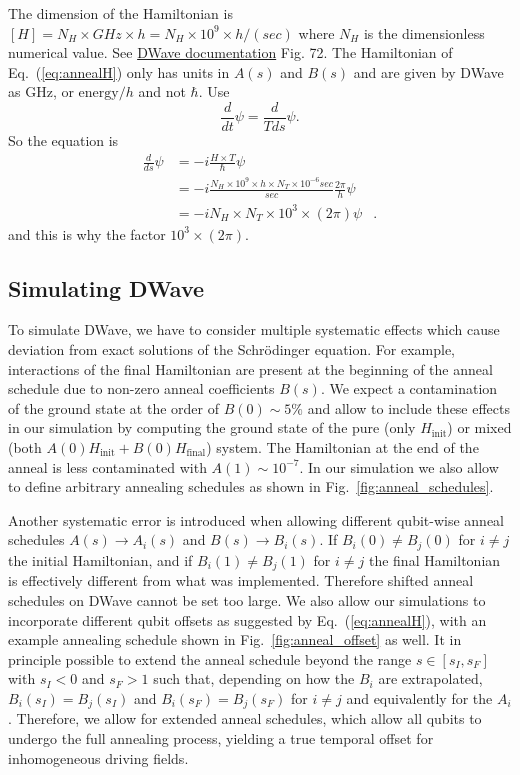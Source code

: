 \documentclass[]{article}
\begin{document}
The dimension of the Hamiltonian is $[H]=N_H \times GHz \times h =N_H \times 10^9  \times h/( sec)$ where $N_H$ is the dimensionless numerical value. See 
\href{https://docs.dwavesys.com/docs/latest/c_qpu_0.html#quantum-annealing-with-ising-spins-in-a-transverse-field}{DWave documentation} Fig. 72. The Hamiltonian of Eq.~(\ref{eq:annealH}) only has units in $A(s)$ and $B(s)$ and are given by DWave as GHz, or $\mathrm{energy}/h$ and not $\hbar$.
Use
\begin{equation}
\frac{d}{dt}\psi = \frac{d}{Tds}\psi .
\end{equation}
So the equation is
\begin{align}
  \frac{d}{ds}\psi  &=  -i \frac{H\times T}{\hbar} \psi  &\\
   &=  -i \frac{N_H \times 10^9 \times h \times N_T \times 10^{-6} sec}{ sec  }\frac{2\pi}{h} \psi &  \\
  &= -i N_H \times N_T \times 10^{3} \times (2\pi) \psi  &.
\end{align}
and this is why the factor $10^{3} \times (2\pi)$.

\subsection{Simulating DWave}
To simulate DWave, we have to consider multiple systematic effects which cause deviation from exact solutions of the Schrödinger equation.
For example, interactions of the final Hamiltonian are present at the beginning of the anneal schedule due to non-zero anneal coefficients $B(s)$.
We expect a contamination of the ground state at the order of $B(0) \sim 5\%$ and allow to include these effects in our simulation by computing the ground state of the pure (only $H_\mathrm{init}$) or mixed (both $A(0) H_\mathrm{init} + B(0) H_\mathrm{final}$) system.
The Hamiltonian at the end of the anneal is less contaminated with $A(1) \sim 10^{-7}$.
In our simulation we also allow to define arbitrary annealing schedules as shown in Fig.~\ref{fig:anneal_schedules}.

Another systematic error is introduced when allowing different qubit-wise anneal schedules $A(s) \to A_i(s)$ and $B(s) \to B_i(s)$.
If $B_i(0) \neq B_j(0)$ for $i \neq j$ the initial Hamiltonian, and if $B_i(1) \neq B_j(1)$ for $i \neq j$ the final Hamiltonian is effectively different from what was implemented.
Therefore shifted anneal schedules on DWave cannot be set too large. We also allow our simulations to incorporate different qubit offsets as suggested by Eq.~(\ref{eq:annealH}), with an example annealing schedule shown in Fig.~\ref{fig:anneal_offset} as well.
It in principle possible to extend the anneal schedule beyond the range $s \in [s_I, s_F]$ with $s_I < 0$ and $s_F > 1$ such that, depending on how the $B_i$ are extrapolated, $B_i(s_I) = B_j(s_I)$ and $B_i(s_F) = B_j(s_F)$ for $i \neq j$ and equivalently for the $A_i$.
Therefore, we allow for extended anneal schedules, which allow all qubits to undergo the full annealing process, yielding a true temporal offset for inhomogeneous driving fields.
\end{document}

